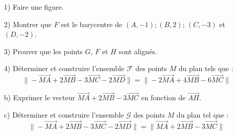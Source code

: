 \documentclass[12pt]{article}
\begin{document}
\begin{enumerate}
    \item[1)] Faire une figure.
    \item[2)] Montrer que \( F \) est le barycentre de \( (A, -1); (B, 2) \); \( (C, -3) \) et \( (D, -2) \).
    \item[3)] Prouver que les points \( G \), \( F \) et \( H \) sont alignés.
    \item[4)] Déterminer et construire l'ensemble \( \mathcal{F} \) des points \( M \) du plan tels que :
    \[
    \| - \overrightarrow{MA} + 2 \overrightarrow{MB} - 3 \overrightarrow{MC} - 2 \overrightarrow{MD} \| = \| - 2 \overrightarrow{MA} + 4 \overrightarrow{MB} - 6 \overrightarrow{MC} \|
    \]
    \item[b)] Exprimer le vecteur \( \overrightarrow{MA} + 2 \overrightarrow{MB} - 3 \overrightarrow{MC} \) en fonction de \( \overrightarrow{AH} \).
    \item[c)] Déterminer et construire l'ensemble \( \mathcal{G} \) des points \( M \) du plan tel que :
    \[
    \| -\overrightarrow{MA} + 2 \overrightarrow{MB} - 3 \overrightarrow{MC} - 2 \overrightarrow{MD} \| = \| \overrightarrow{MA} + 2 \overrightarrow{MB} - 3 \overrightarrow{MC} \|
    \]
\end{enumerate}
\end{document}
